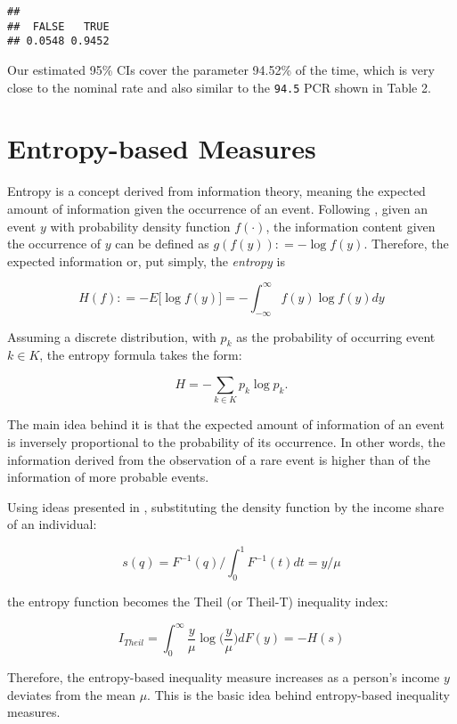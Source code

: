\documentclass[
]{book}
\begin{document}
\begin{verbatim}
## 
##  FALSE   TRUE 
## 0.0548 0.9452
\end{verbatim}

Our estimated 95\% CIs cover the parameter 94.52\% of the time, which is very close to the nominal rate and also similar to the \texttt{94.5} PCR shown in Table 2.

\hypertarget{entropy-based-measures}{%
\section{Entropy-based Measures}\label{entropy-based-measures}}

Entropy is a concept derived from information theory, meaning the expected amount of information given the occurrence of an event. Following \autocite{shannon1948}, given an event \(y\) with probability density function \(f(\cdot)\), the information content given the occurrence of \(y\) can be defined as \(g(f(y)) \colon= - \log f(y)\). Therefore, the expected information or, put simply, the \emph{entropy} is

\[
H(f) \colon = -E \big[ \log f(y) \big] = - \int_{-\infty}^{\infty} f(y) \log f(y) dy
\]

Assuming a discrete distribution, with \(p_k\) as the probability of occurring event \(k \in K\), the entropy formula takes the form:

\[
H = - \sum_{k \in K} p_k \log p_k \text{.}
\]

The main idea behind it is that the expected amount of information of an event is inversely proportional to the probability of its occurrence. In other words, the information derived from the observation of a rare event is higher than of the information of more probable events.

Using ideas presented in \textcite{cowell2009}, substituting the density function by the income share of an individual:

\[
s(q) = {F}^{-1}(q) / \int_{0}^{1} F^{-1}(t)dt = y/\mu
\]

the entropy function becomes the Theil (or Theil-T) inequality index:

\[
I_{Theil} = \int_{0}^{\infty} \frac{y}{\mu} \log \bigg( \frac{y}{\mu} \bigg) dF(y) = -H(s)
\]

Therefore, the entropy-based inequality measure increases as a person's income \(y\) deviates from the mean \(\mu\). This is the basic idea behind entropy-based inequality measures.
\end{document}

